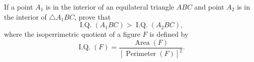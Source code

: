 If a point $A_1$ is in the interior of an equilateral triangle $ABC$ and point $A_2$ is in the interior of $\triangle{A_1BC}$,  prove that \[\operatorname{I.Q.} (A_1BC) > \operatorname{I.Q.} (A_2BC),\]where the isoperrimetric quotient of a figure $F$ is defined by \[\operatorname{I.Q.}(F) = \frac{\operatorname{Area}(F)}{[\operatorname{Perimeter}(F)]^2}.\]